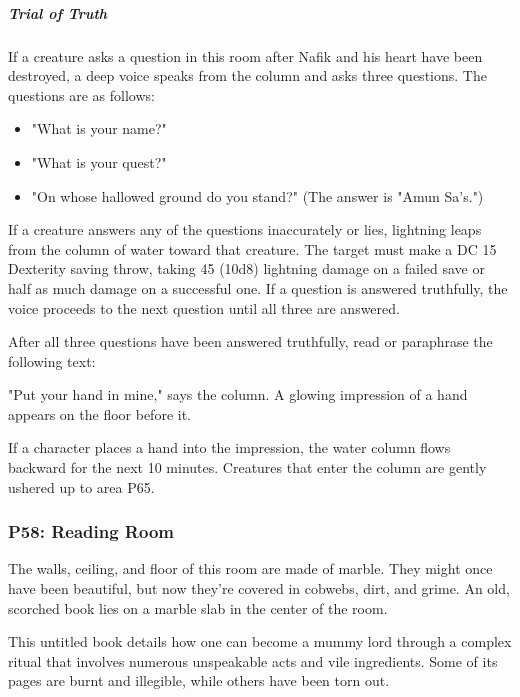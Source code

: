 \documentclass[10pt,a4paper,twoside,bg=print,twocolumn,openany,nodeprecatedcode]{dndbook}
\begin{document}
\subparagraph{Trial of Truth}
If a creature asks a question in this room after Nafik and his heart have been destroyed, a deep voice speaks from the column and asks three questions. The questions are as follows:


\begin{itemize}
\item "What is your name?"
\item "What is your quest?"
\item "On whose hallowed ground do you stand?" (The answer is "Amun Sa's.")
\end{itemize}

If a creature answers any of the questions inaccurately or lies, lightning leaps from the column of water toward that creature. The target must make a DC 15 Dexterity saving throw, taking 45 (10d8) lightning damage on a failed save or half as much damage on a successful one. If a question is answered truthfully, the voice proceeds to the next question until all three are answered.

After all three questions have been answered truthfully, read or paraphrase the following text:

\begin{DndReadAloud}{}
"Put your hand in mine," says the column. A glowing impression of a hand appears on the floor before it.

\end{DndReadAloud}

If a character places a hand into the impression, the water column flows backward for the next 10 minutes. Creatures that enter the column are gently ushered up to area P65.

\subsubsection{P58: Reading Room}
\begin{DndReadAloud}{}
The walls, ceiling, and floor of this room are made of marble. They might once have been beautiful, but now they're covered in cobwebs, dirt, and grime. An old, scorched book lies on a marble slab in the center of the room.

\end{DndReadAloud}

This untitled book details how one can become a mummy lord through a complex ritual that involves numerous unspeakable acts and vile ingredients. Some of its pages are burnt and illegible, while others have been torn out.
\end{document}
